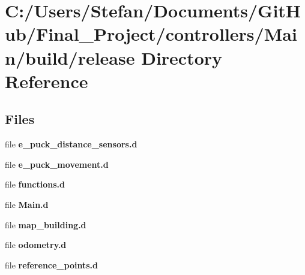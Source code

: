 \section{C\-:/\-Users/\-Stefan/\-Documents/\-Git\-Hub/\-Final\-\_\-\-Project/controllers/\-Main/build/release Directory Reference}
\label{dir_33396ef7498af4ba63da784be58c9ffe}
\subsection*{Files}
\begin{DoxyCompactItemize}
\item 
file {\bf e\-\_\-puck\-\_\-distance\-\_\-sensors.\-d}
\item 
file {\bf e\-\_\-puck\-\_\-movement.\-d}
\item 
file {\bf functions.\-d}
\item 
file {\bf Main.\-d}
\item 
file {\bf map\-\_\-building.\-d}
\item 
file {\bf odometry.\-d}
\item 
file {\bf reference\-\_\-points.\-d}
\end{DoxyCompactItemize}
